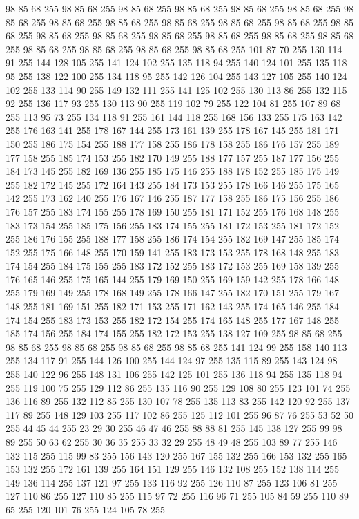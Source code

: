 98 85 68 255 98 85 68 255 98 85 68 255 98 85 68 255 98 85 68 255 98 85 68 255 98 85 68 255 98 85 68 255 98 85 68 255 98 85 68 255 98 85 68 255 98 85 68 255 98 85 68 255 98 85 68 255 98 85 68 255 98 85 68 255 98 85 68 255 98 85 68 255 98 85 68 255 98 85 68 255 98 85 68 255 98 85 68 255 98 85 68 255 101 87 70 255 130 114 91 255 144 128 105 255 141 124 102 255 135 118 94 255 140 124 101 255 135 118 95 255 138 122 100 255 134 118 95 255 142 126 104 255 143 127 105 255 140 124 102 255 133 114 90 255 149 132 111 255 141 125 102 255 130 113 86 255 132 115 92 255 136 117 93 255 130 113 90 255 119 102 79 255 122 104 81 255 107 89 68 255 113 95 73 255 134 118 91 255 161 144 118 255 168 156 133 255 175 163 142 255 176 163 141 255 178 167 144 255 173 161 139 255 178 167 145 255 181 171 150 255 186 175 154 255 188 177 158 255 186 178 158 255 186 176 157 255 189 177 158 255 185 174 153 255 182 170 149 255 188 177 157 255 187 177 156 255
184 173 145 255 182 169 136 255 185 175 146 255 188 178 152 255 185 175 149 255 182 172 145 255 172 164 143 255 184 173 153 255 178 166 146 255 175 165 142 255 173 162 140 255 176 167 146 255 187 177 158 255 186 175 156 255 186 176 157 255 183 174 155 255 178 169 150 255 181 171 152 255 176 168 148 255 183 173 154 255 185 175 156 255 183 174 155 255 181 172 153 255 181 172 152 255 186 176 155 255 188 177 158 255 186 174 154 255 182 169 147 255 185 174 152 255 175 166 148 255 170 159 141 255 183 173 153 255 178 168 148 255 183 174 154 255 184 175 155 255 183 172 152 255 183 172 153 255 169 158 139 255 176 165 146 255 175 165 144 255 179 169 150 255 169 159 142 255 178 166 148 255 179 169 149 255 178 168 149 255 178 166 147 255 182 170 151 255 179 167 148 255 181 169 151 255 182 171 153 255 171 162 143 255 174 165 146 255 184 174 154 255 183 173 153 255 182 172 154 255 174 165 148 255 177 167 148 255 185 174 156 255 184 174 155 255 182 172 153 255 138 127 109 255 98 85 68 255 98 85 68 255 98 85 68 255
98 85 68 255 98 85 68 255 141 124 99 255 158 140 113 255 134 117 91 255 144 126 100 255 144 124 97 255 135 115 89 255 143 124 98 255 140 122 96 255 148 131 106 255 142 125 101 255 136 118 94 255 135 118 94 255 119 100 75 255 129 112 86 255 135 116 90 255 129 108 80 255 123 101 74 255 136 116 89 255 132 112 85 255 130 107 78 255 135 113 83 255 142 120 92 255 137 117 89 255 148 129 103 255 117 102 86 255 125 112 101 255 96 87 76 255 53 52 50 255 44 45 44 255 23 29 30 255 46 47 46 255 88 88 81 255 145 138 127 255 99 98 89 255 50 63 62 255 30 36 35 255 33 32 29 255 48 49 48 255 103 89 77 255 146 132 115 255 115 99 83 255 156 143 120 255 167 155 132 255 166 153 132 255 165 153 132 255 172 161 139 255 164 151 129 255 146 132 108 255 152 138 114 255 149 136 114 255 137 121 97 255 133 116 92 255 126 110 87 255 123 106 81 255 127 110 86 255 127 110 85 255 115 97 72 255 116 96 71 255 105 84 59 255 110 89 65 255 120 101 76 255 124 105 78 255
